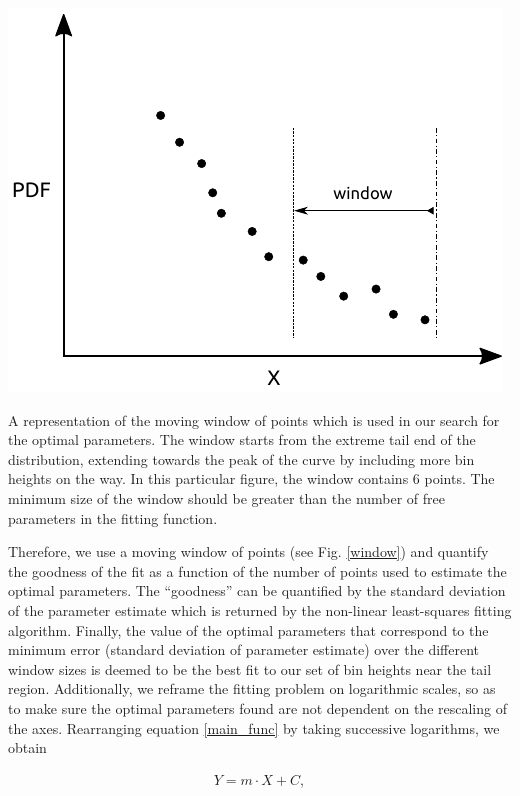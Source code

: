 \begin{marginfigure}[-1cm]
\centering
\includegraphics{plots/drop_stats/window.pdf}
\caption{A representation of the moving window of points which
	is used in our search for the optimal parameters.
	The window starts from the extreme tail end of the 
	distribution, extending towards the peak of the curve
	by including more bin heights on the way. In this 
	particular figure, the window contains $6$ points.
	The minimum size of the window should be greater than
	the number of free parameters in the fitting function.}
\label{window}
\end{marginfigure}


Therefore, we use a moving window of points (see Fig. \ref{window}) and quantify 
the goodness of the fit as a function of the number of points used to estimate the optimal parameters.
The ``goodness'' can be quantified by the standard deviation of the parameter 
estimate which is returned by the non-linear least-squares fitting algorithm.  
Finally, the value of the optimal parameters that correspond to the minimum error 
(standard deviation of parameter estimate) over the different window sizes 
is deemed to be the best fit to our set of bin heights near the tail region.
Additionally, we reframe the fitting problem on logarithmic scales, so 
as to make sure the optimal parameters found are not dependent on the rescaling of the axes. 
Rearranging equation \eqref{main_func} by taking successive logarithms, we obtain 

\begin{align}
Y = m \cdot X + C ,
\label{log_func}
\end{align}

